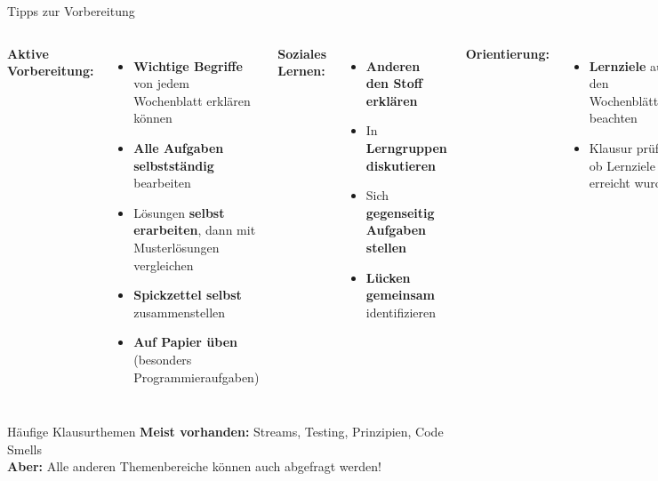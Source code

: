 \begin{frame}{Tipps zur Vorbereitung}
  \begin{columns}[T]
    \textbf{Aktive Vorbereitung:}
    \begin{itemize}
      \item \textbf{Wichtige Begriffe} von jedem Wochenblatt erklären können
      \item \textbf{Alle Aufgaben selbstständig} bearbeiten
      \item Lösungen \textbf{selbst erarbeiten}, dann mit Musterlösungen vergleichen
      \item \textbf{Spickzettel selbst} zusammenstellen
      \item \textbf{Auf Papier üben} (besonders Programmieraufgaben)
    \end{itemize}

    \textbf{Soziales Lernen:}
    \begin{itemize}
      \item \textbf{Anderen den Stoff erklären}
      \item In \textbf{Lerngruppen diskutieren}
      \item Sich \textbf{gegenseitig Aufgaben stellen}
      \item \textbf{Lücken gemeinsam} identifizieren
    \end{itemize}

    \textbf{Orientierung:}
    \begin{itemize}
      \item \textbf{Lernziele} auf den Wochenblättern beachten
      \item Klausur prüft, ob Lernziele erreicht wurden
    \end{itemize}
  \end{columns}

  \begin{exampleblock}{Häufige Klausurthemen}
    \textbf{Meist vorhanden:} Streams, Testing, Prinzipien, Code Smells \\
    \textbf{Aber:} Alle anderen Themenbereiche können auch abgefragt werden!
  \end{exampleblock}
\end{frame}

